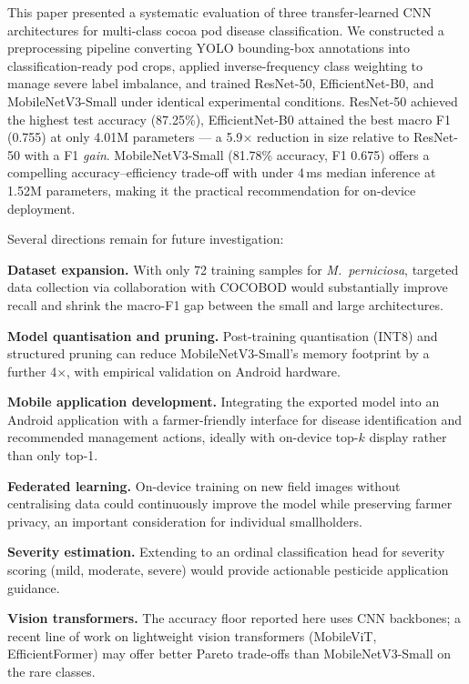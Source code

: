 \documentclass[conference,10pt]{IEEEtran}
\begin{document}
This paper presented a systematic evaluation of three transfer-learned CNN
architectures for multi-class cocoa pod disease classification. We constructed
a preprocessing pipeline converting YOLO bounding-box annotations into
classification-ready pod crops, applied inverse-frequency class weighting to
manage severe label imbalance, and trained ResNet-50, EfficientNet-B0, and
MobileNetV3-Small under identical experimental conditions. ResNet-50 achieved
the highest test accuracy (87.25\%), EfficientNet-B0 attained the best macro
F1 (0.755) at only 4.01M parameters --- a 5.9$\times$ reduction in size
relative to ResNet-50 with a F1 \emph{gain}. MobileNetV3-Small (81.78\%
accuracy, F1 0.675) offers a compelling accuracy--efficiency trade-off with
under 4\,ms median inference at 1.52M parameters, making it the practical
recommendation for on-device deployment.

Several directions remain for future investigation:

\textbf{Dataset expansion.} With only 72 training samples for
\textit{M.\ perniciosa}, targeted data collection via collaboration with
COCOBOD would substantially improve recall and shrink the macro-F1 gap
between the small and large architectures.

\textbf{Model quantisation and pruning.} Post-training quantisation (INT8)
and structured pruning can reduce MobileNetV3-Small's memory footprint by a
further 4$\times$, with empirical validation on Android hardware.

\textbf{Mobile application development.} Integrating the exported model into
an Android application with a farmer-friendly interface for disease
identification and recommended management actions, ideally with on-device
top-$k$ display rather than only top-1.

\textbf{Federated learning.} On-device training on new field images without
centralising data could continuously improve the model while preserving
farmer privacy, an important consideration for individual smallholders.

\textbf{Severity estimation.} Extending to an ordinal classification head for
severity scoring (mild, moderate, severe) would provide actionable pesticide
application guidance.

\textbf{Vision transformers.} The accuracy floor reported here uses CNN
backbones; a recent line of work on lightweight vision transformers
(MobileViT, EfficientFormer) may offer better Pareto trade-offs than
MobileNetV3-Small on the rare classes.
\end{document}
